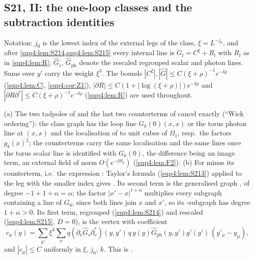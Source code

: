 
\subsection{S21, II: the one-loop classes and the subtraction identities}\label{sup4:ssec:S21b}

Notation: $j_0$ is the lowest index of the external legs of the class, $\xi=L^{-j_0}$, and after \cref{sup4:lem:S214,sup4:lem:S215} every internal line is $\breve G_l=C^\xi+R_l$ with $R_l$ as in \cref{sup4:lem:R}; $\hat G_s$, $\hat G_{\mathrm{ph}}$ denote the rescaled regrouped scalar and photon lines. Sums over $y'$ carry the weight $\xi^3$. The bounds $|C^\xi|,|\hat G|\le C(\xi+\rho)^{-1}e^{-\delta\rho}$ (\cref{sup4:lem:C}, \cref{sup4:cor:Z1}), $|\partial R|\le C(1+|\log(\xi+\rho)|)e^{-\delta\rho}$ and $|\partial R\partial^*|\le C(\xi+\rho)^{-1}e^{-\delta\rho}$ (\cref{sup4:lem:R}) are used throughout.

\begin{lemma}[{scalar self-energies with $D=-1$, \cite[(3.6)--(3.17)]{Ba3}}]\label{sup4:lem:S218}
\textup{(a)} The two tadpoles of \cite[(3.6)]{Ba3} and the last two counterterms of \cite[(3.7)]{Ba3} cancel exactly (``Wick ordering''): the class graph has the loop line $G_k(0)(x,x)$ or the torus photon line at $(x,x)$ and the localisation of \cite[(1.6)]{Ba3} to unit cubes of $\Omega_1$, resp.\ the factors $g_k(x)^2$; the counterterms \cite[(1.29)]{Ba3} carry the same localisation and the same lines once the torus scalar line is identified with $G_k(0)$, the difference being an image term, an external field of norm $O(e^{-\delta S_k})$ (\cref{sup4:lem:F2}). \textup{(b)} For \cite[(3.8)]{Ba3} minus its counterterm, i.e.\ the expression \cite[(3.9)]{Ba3}: Taylor's formula (\cref{sup4:lem:S213}) applied to the leg with the smaller index \cite[p.~435]{Ba3} gives \cite[(3.11)]{Ba3}. Its second term is the generalised graph \cite[(3.12)]{Ba3}, of degree $-1+1+\alpha=\alpha$; the factor $|x'-x|^{1+\alpha}$ multiplies every subgraph containing a line of $G_0$, since both lines join $x$ and $x'$, so its \cite[(2.4)]{Ba3}-subgraph has degree $1+\alpha>0$. Its first term, regrouped (\cref{sup4:lem:S214}) and rescaled (\cref{sup4:lem:S215}, $D=0$), is the vertex \cite[(3.15)]{Ba3} with coefficient
\[
c_\mu(y)=\sum_{y'}\xi^3\sum_\nu q(\partial_\nu\hat G_s\partial_\nu^*)(y,y')\,q\,g(y)\hat G_{\mathrm{ph}}(y,y')g'(y')\,(y'_\mu-y_\mu),
\]
and $|c_\mu|\le C$ uniformly in $\xi$, $j_0$, $k$. This is \cite[(3.17)]{Ba3}.
\end{lemma}

